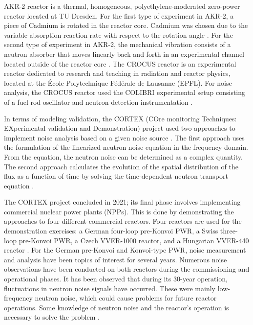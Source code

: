 AKR-2 reactor is a thermal, homogeneous, polyethylene-moderated zero-power reactor located at TU Dresden. For the first type of experiment in AKR-2, a piece of Cadmium is rotated in the reactor core. Cadmium was chosen due to the variable absorption reaction rate with respect to the rotation angle \cite{hubnerEXPERIMENTALDETERMINATIONZERO2021}. For the second type of experiment in AKR-2, the mechanical vibration consists of a neutron absorber that moves linearly back and forth in an experimental channel located outside of the reactor core \cite{lamirandExperimentalReport1st2018}. The CROCUS reactor is an experimental reactor dedicated to research and teaching in radiation and reactor physics, located at the École Polytechnique Fédérale de Lausanne (EPFL). For noise analysis, the CROCUS reactor used the COLIBRI experimental setup consisting of a fuel rod oscillator and neutron detection instrumentation \cite{lamirandExperimentalReport1st2018, lamirandExperimentalReport2nd2021, lamirandExperimentalReport3rd2021, lamirandCOLIBRIExperimentalProgram2020}. 

In terms of modeling validation, the CORTEX (COre monitoring Techniques: EXperimental validation and Demonstration) project used two approaches to implement noise analysis based on a given noise source \cite{demaziereCORTEXProjectImproving2020}. The first approach uses the formulation of the linearized neutron noise equation in the frequency domain. From the equation, the neutron noise can be determined as a complex quantity. The second approach calculates the evolution of the spatial distribution of the flux as a function of time by solving the time-dependent neutron transport equation \cite{hursinModelingNoiseExperiments2023, brighentiDevelopmentValidationTimedependent2022}. 

The CORTEX project concluded in 2021; its final phase involves implementing commercial nuclear power plants (NPPs). This is done by demonstrating the approaches to four different commercial reactors. Four reactors are used for the demonstration exercises: a German four-loop pre-Konvoi PWR, a Swiss three-loop pre-Konvoi PWR, a Czech VVER-1000 reactor, and a Hungarian VVER-440 reactor \cite{demaziereCORTEXProjectImproving2020, seidlReviewHistoricNeutron2015}. For the German pre-Konvoi and Konvoi-type PWR, noise measurement and analysis have been topics of interest for several years. Numerous noise observations have been conducted on both reactors during the commissioning and operational phases. It has been observed that during its 30-year operation, fluctuations in neutron noise signals have occurred. These were mainly low-frequency neutron noise, which could cause problems for future reactor operations. Some knowledge of neutron noise and the reactor's operation is necessary to solve the problem \cite{seidlReviewHistoricNeutron2015, rohdeNeutronNoiseObservations2018}.


